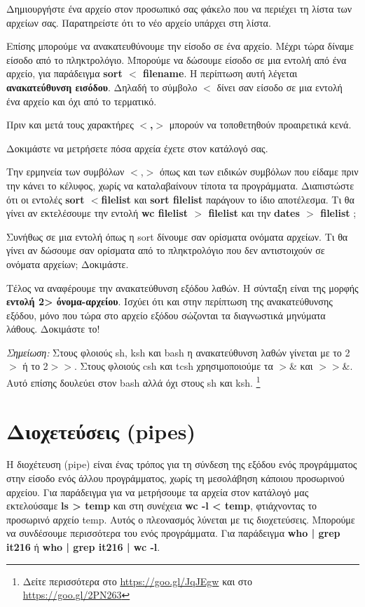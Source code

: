 Δημιουργήστε ένα αρχείο στον προσωπικό σας φάκελο που να περιέχει τη λίστα των αρχείων σας. Παρατηρείστε ότι το νέο αρχείο υπάρχει στη λίστα. 

Επίσης μπορούμε να ανακατευθύνουμε την είσοδο σε ένα αρχείο. Μέχρι τώρα δίναμε είσοδο από το πληκτρολόγιο. Μπορούμε να δώσουμε είσοδο σε μια εντολή από ένα αρχείο, για παράδειγμα \textbf{sort $<$ filename}. Η περίπτωση αυτή λέγεται \textbf{ανακατεύθυνση εισόδου}.  Δηλαδή το σύμβολο
\textbf{$<$} δίνει σαν είσοδο σε μια εντολή ένα αρχείο και όχι από το τερματικό. 

Πριν και μετά τους χαρακτήρες \textbf{$<$,$>$} μπορούν να τοποθετηθούν προαιρετικά κενά. 

Δοκιμάστε να μετρήσετε πόσα αρχεία έχετε στον κατάλογό σας.

Την ερμηνεία των συμβόλων $<$,$>$ όπως και των ειδικών συμβόλων που είδαμε πριν την κάνει το κέλυφος, χωρίς να καταλαβαίνουν τίποτα τα προγράμματα. Διαπιστώστε ότι οι εντολές \textbf{sort $<$filelist} και \textbf{sort filelist} παράγουν το ίδιο αποτέλεσμα. Τι θα γίνει αν
εκτελέσουμε την εντολή \textbf{wc filelist $>$ filelist} και την \textbf{dates $>$ filelist} ;

Συνήθως σε μια εντολή όπως η sort δίνουμε σαν ορίσματα ονόματα αρχείων. Τι θα γίνει αν δώσουμε σαν ορίσματα από το πληκτρολόγιο που δεν
αντιστοιχούν σε ονόματα αρχείων; Δοκιμάστε.

Τέλος να αναφέρουμε την ανακατεύθυνση εξόδου λαθών. Η σύνταξη είναι της μορφής \textbf{εντολή 2> όνομα-αρχείου}.    Ισχύει ότι και στην
περίπτωση της ανακατεύθυνσης εξόδου, μόνο που τώρα στο αρχείο εξόδου σώζονται τα
διαγνωστικά μηνύματα λάθους. Δοκιμάστε το!

\emph{Σημείωση:} Στους φλοιούς sh, ksh και bash η ανακατεύθυνση λαθών γίνεται με το 2$>$ ή το 2$>>$. Στους φλοιούς csh και tcsh χρησιμοποιούμε
τα $>$\& και $>>$\&. Αυτό επίσης δουλεύει στον bash αλλά όχι στους sh και ksh. \footnote{Δείτε περισσότερα στο \href{https://goo.gl/JqJEgw}{https://goo.gl/JqJEgw} και στο \href{https://goo.gl/2PN263}{https://goo.gl/2PN263}}



\section{Διοχετεύσεις (pipes)}

Η διοχέτευση (pipe) είναι ένας τρόπος για τη σύνδεση της εξόδου ενός προγράμματος στην είσοδο ενός άλλου προγράμματος, χωρίς τη μεσολάβηση
κάποιου προσωρινού αρχείου. Για παράδειγμα για να μετρήσουμε τα αρχεία στον κατάλογό μας εκτελούσαμε \textbf{ls > temp} και  στη συνέχεια
\textbf{wc -l < temp}, φτιάχνοντας το προσωρινό αρχείο temp. Αυτός ο πλεονασμός λύνεται με τις διοχετεύσεις. Μπορούμε να συνδέσουμε
περισσότερα του ενός προγράμματα. Για παράδειγμα \textbf{who | grep it216} ή \textbf{who | grep it216 | wc -l}.


